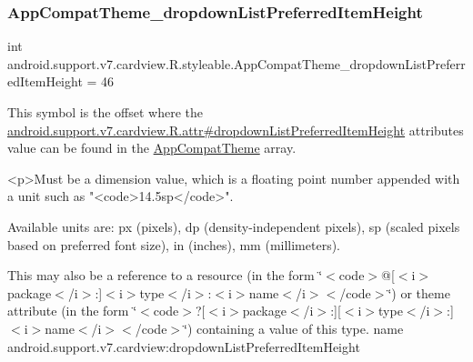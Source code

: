 \subsubsection{\texorpdfstring{App\+Compat\+Theme\+\_\+dropdown\+List\+Preferred\+Item\+Height}{AppCompatTheme\_dropdownListPreferredItemHeight}}
{\footnotesize\ttfamily int android.\+support.\+v7.\+cardview.\+R.\+styleable.\+App\+Compat\+Theme\+\_\+dropdown\+List\+Preferred\+Item\+Height = 46\hspace{0.3cm}{\ttfamily [static]}}

This symbol is the offset where the \hyperlink{classandroid_1_1support_1_1v7_1_1cardview_1_1R_1_1attr_abd1874e372581dedbc2529cb02c57d06}{android.\+support.\+v7.\+cardview.\+R.\+attr\#dropdown\+List\+Preferred\+Item\+Height} attribute\textquotesingle{}s value can be found in the \hyperlink{classandroid_1_1support_1_1v7_1_1cardview_1_1R_1_1styleable_a52e6f69f954ecc2622d72c0b4d298938}{App\+Compat\+Theme} array.

\begin{DoxyVerb}      <p>Must be a dimension value, which is a floating point number appended with a unit such as "<code>14.5sp</code>".
\end{DoxyVerb}
 Available units are\+: px (pixels), dp (density-\/independent pixels), sp (scaled pixels based on preferred font size), in (inches), mm (millimeters). 

This may also be a reference to a resource (in the form \char`\"{}$<$code$>$@\mbox{[}$<$i$>$package$<$/i$>$\+:\mbox{]}$<$i$>$type$<$/i$>$\+:$<$i$>$name$<$/i$>$$<$/code$>$\char`\"{}) or theme attribute (in the form \char`\"{}$<$code$>$?\mbox{[}$<$i$>$package$<$/i$>$\+:\mbox{]}\mbox{[}$<$i$>$type$<$/i$>$\+:\mbox{]}$<$i$>$name$<$/i$>$$<$/code$>$\char`\"{}) containing a value of this type.  name android.\+support.\+v7.\+cardview\+:dropdown\+List\+Preferred\+Item\+Height \mbox{\label{classandroid_1_1support_1_1v7_1_1cardview_1_1R_1_1styleable_a9d95b8b96fc0c33fe2ccdbca4bb4c766}} 
